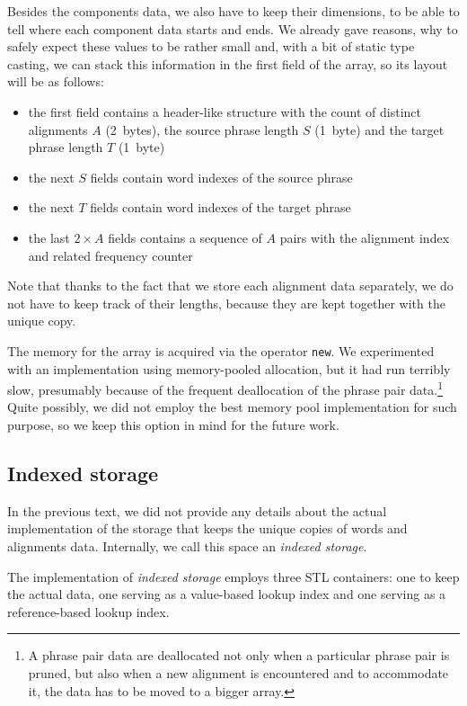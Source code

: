 Besides the components data, we also have to keep their dimensions,
to be able to tell where each component data starts and ends.
We already gave reasons, why to safely expect these values to be rather small and,
with a bit of static type casting, we can stack this information in the first
field of the array, so its layout will be as follows:
\begin{itemize}
  \item the first field contains a header-like structure with the count
    of distinct alignments $A$ (2~bytes),
    the source phrase length $S$ (1~byte) and the target phrase length $T$ (1~byte)
  \item the next $S$ fields contain word indexes of the source phrase
  \item the next $T$ fields contain word indexes of the target phrase
  \item the last $2 \times A$ fields contains a sequence of $A$ pairs with
    the alignment index and related frequency counter
\end{itemize}

Note that thanks to the fact that we store each alignment data separately, we do not
have to keep track of their lengths, because they are kept together with the unique copy.

The memory for the array is acquired via the operator \texttt{new}.
We experimented with an implementation using memory-pooled allocation,
but it had run terribly slow, presumably because of the frequent deallocation
of the phrase pair data.\footnote{A phrase pair data are deallocated not only
when a particular phrase pair is pruned, but also when a new alignment is
encountered and to accommodate it, the data has to be moved to a bigger array.}
Quite possibly, we did not employ the best memory pool implementation for such
purpose, so we keep this option in mind for the future work.

\subsection{Indexed storage}

In the previous text, we did not provide any details about the actual implementation of
the storage that keeps the unique copies of words and alignments data.
Internally, we call this space an \emph{indexed storage}.

The implementation of \emph{indexed storage} employs three STL containers: one to keep
the actual data, one serving as a value-based lookup index and one serving as
a reference-based lookup index.

